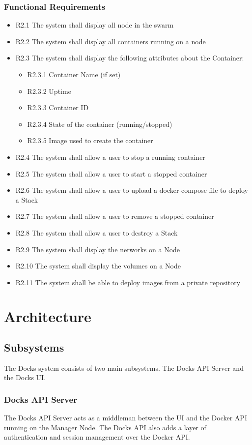 \documentclass[]{article}
\begin{document}
\subsubsection{Functional Requirements}
\begin{itemize}
	\item R2.1 The system shall display all node in the swarm
	\item R2.2 The system shall display all containers running on a node
	\item R2.3 The system shall display the following attributes about the Container:
		\begin{itemize}
			\item R2.3.1 Container Name (if set)
			\item R2.3.2 Uptime
			\item R2.3.3 Container ID
			\item R2.3.4 State of the container (running/stopped)
			\item R2.3.5 Image used to create the container
		\end{itemize}
	\item R2.4 The system shall allow a user to stop a running container
	\item R2.5 The system shall allow a user to start a stopped container
	\item R2.6 The system shall allow a user to upload a docker-compose file to deploy a Stack
	\item R2.7 The system shall allow a user to remove a stopped container
	\item R2.8 The system shall allow a user to destroy a Stack
	\item R2.9 The system shall display the networks on a Node
	\item R2.10 The system shall display the volumes on a Node
	\item R2.11 The system shall be able to deploy images from a private repository
\end{itemize}

\section{Architecture}
\subsection{Subsystems}
The Docks system consists of two main subsystems. The Docks API Server and the Docks UI.
\subsubsection{Docks API Server}
The Docks API Server acts as a middleman between the UI and the Docker API running on the Manager Node. The Docks API also adds a layer of authentication and session management over the Docker API. 
\end{document}
